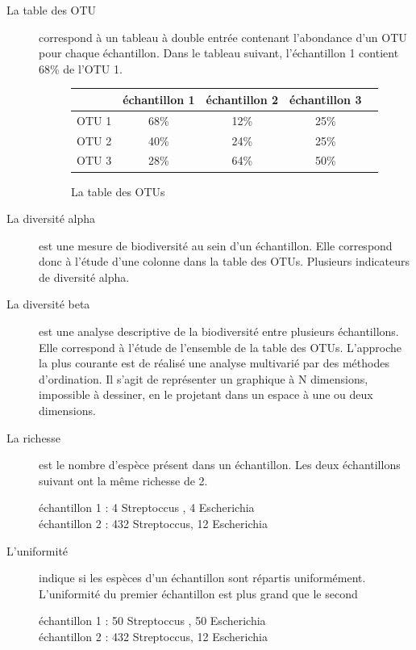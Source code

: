 \documentclass[12pt,a4paper]{article}
\begin{document}
\begin{description}
\item[La table des OTU] correspond à un tableau à double entrée contenant l’abondance d’un OTU pour chaque échantillon. Dans le tableau suivant, l'échantillon 1 contient 68\% de l'OTU 1.

\begin{figure}
\begin{center}
\begin{tabular}{|l|c|c|c|c}
  \hline
   & échantillon 1 & échantillon 2 & échantillon 3  \\
  \hline
  OTU 1 & 68\% & 12\% & 25\% \\
  OTU 2 & 40\% & 24\% & 25\% \\
  OTU 3 & 28\% & 64\% & 50\% \\

  \hline
\end{tabular}
\end{center}
\caption{La table des OTUs}
\end{figure}

\item[La diversité alpha] est une mesure de biodiversité au sein d’un échantillon. Elle correspond donc à l’étude d’une colonne dans la table des OTUs. Plusieurs indicateurs de diversité alpha.

\item[La diversité beta] est une analyse descriptive de la biodiversité entre plusieurs échantillons. Elle correspond à l’étude de l’ensemble de la table des OTUs. L’approche la plus courante est de réalisé une analyse multivarié par des méthodes d’ordination. Il s’agit de représenter un graphique à N dimensions, impossible à dessiner, en le projetant dans un espace à une ou deux dimensions.

\item[La richesse] est le nombre d’espèce présent dans un échantillon. Les deux échantillons suivant ont la même richesse de 2. 

échantillon 1  : 4 Streptoccus , 4 Escherichia  \\ 
échantillon 2 : 432 Streptoccus, 12 Escherichia 

\item[L'uniformité] indique si les espèces d’un échantillon sont répartis uniformément.
L'uniformité du premier échantillon est plus grand que le second

échantillon 1  : 50 Streptoccus , 50 Escherichia  \\ 
échantillon 2 : 432 Streptoccus, 12 Escherichia 



\end{description}
\end{document}
